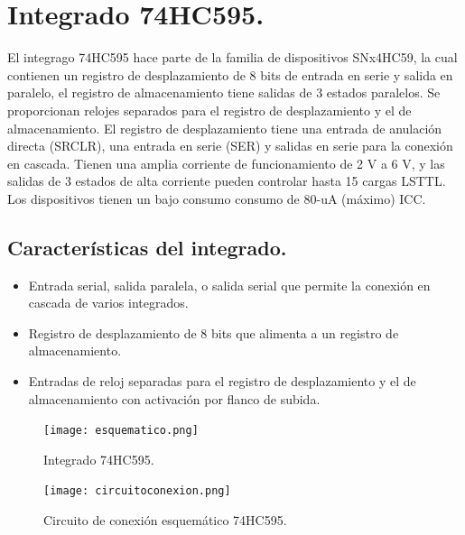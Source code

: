 \documentclass{article}
\begin{document}
\section{Integrado 74HC595.} \label{Integrado}
El integrago 74HC595 hace parte de la familia de dispositivos SNx4HC59, la cual contienen un registro de desplazamiento de 8 bits de entrada en serie y salida en paralelo, el registro de almacenamiento tiene salidas de 3 estados paralelos. Se proporcionan relojes separados para el registro de desplazamiento y el de almacenamiento. El registro de desplazamiento tiene una entrada de anulación directa (SRCLR), una entrada en serie (SER) y salidas en serie para la conexión en cascada. Tienen una amplia corriente de funcionamiento de 2 V a 6 V, y las salidas de 3 estados de alta corriente pueden controlar hasta 15 cargas LSTTL. Los dispositivos tienen un bajo consumo consumo de 80-uA (máximo) ICC.
\subsection{Características del integrado.}\label{caracteristicas}
 \begin{itemize}
 
\item Entrada serial, salida paralela, o salida serial que permite la conexión en cascada de varios integrados.
\item Registro de desplazamiento de 8 bits que alimenta a un registro de almacenamiento.
\item Entradas de reloj separadas para el registro de desplazamiento y el de almacenamiento con activación por flanco de subida.

\end{itemize}

\begin{figure}[h]
\texttt{[image: esquematico.png]}
\centering
\caption{Integrado 74HC595.}
\label{fig:int74HC959}
\end{figure}

\begin{figure}[h]
\texttt{[image: circuitoconexion.png]}
\centering
\caption{Circuito de conexión esquemático 74HC595.}
\label{fig:Circuito de conexión esquemético}
\end{figure}
\end{document}
